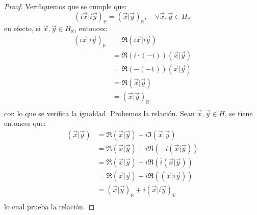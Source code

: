 \documentclass[12pt]{report}
\theoremstyle{largebreak}
\newcommand\pint[2]{\ensuremath{\left(#1\big|#2\right)}}
\newcommand\conj[1]{\ensuremath{\overline{#1}}}
\begin{document}
\begin{proof}
        Verifiquemos que se cumple que:
        \begin{equation*}
            \pint{i\vec{x}}{i\vec{y}}_{\mathbb{R}}=\pint{\vec{x}}{\vec{y}}_{\mathbb{R}},\quad\forall\vec{x},\vec{y}\in H_{\mathbb{R}}
        \end{equation*}
        en efecto, si $\vec{x},\vec{y}\in H_{\mathbb{R}}$, entonces:
        \begin{equation*}
            \begin{split}
                \pint{i\vec{x}}{i\vec{y}}_{\mathbb{R}}&=\Re\pint{i\vec{x}}{i\vec{y}}\\
                &=\Re(i\cdot(-i))\pint{\vec{x}}{\vec{y}}\\
                &=\Re(-(-1))\pint{\vec{x}}{\vec{y}}\\
                &=\Re\pint{\vec{x}}{\vec{y}}\\
                &=\pint{\vec{x}}{\vec{y}}_{\mathbb{R}}\\
            \end{split}
        \end{equation*}
        con lo que se verifica la igualdad. Probemos la relación. Sean $\vec{x},\vec{y}\in H$, se tiene entonces que:
        \begin{equation*}
            \begin{split}
                \pint{\vec{x}}{\vec{y}}&=\Re\pint{\vec{x}}{\vec{y}}+i\Im\pint{\vec{x}}{\vec{y}}\\
                &=\Re\pint{\vec{x}}{\vec{y}}+i\Re(-i\pint{\vec{x}}{\vec{y}})\\
                &=\Re\pint{\vec{x}}{\vec{y}}+i\Re(\conj{i}\pint{\vec{x}}{\vec{y}})\\
                &=\Re\pint{\vec{x}}{\vec{y}}+i\Re(\pint{\vec{x}}{i\vec{y}})\\
                &=\pint{\vec{x}}{\vec{y}}_{\mathbb{R}}+i\pint{\vec{x}}{i\vec{y}}_{\mathbb{R}}\\
            \end{split}
        \end{equation*}
        lo cual prueba la relación.


\end{proof}
\end{document}
